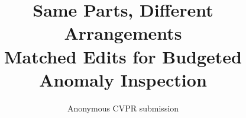 \documentclass[10pt,twocolumn,letterpaper]{article}
\title{Same Parts, Different Arrangements\\Matched Edits for Budgeted Anomaly Inspection}
\author{Anonymous CVPR submission}
\begin{document}
\renewcommand{\dblfloatpagefraction}{0.5}

\FloatBarrier
{\small


}
\end{document}
